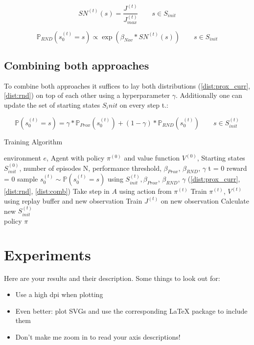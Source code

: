\documentclass{article}
\begin{document}
\[ SN^{(t)}(s) = \frac{J^{(t)}}{J_{max}^{(t)}} \qquad s \in S_{init} \]

\begin{equation}\label{dist:rnd}
  \mathbb{P}_{RND}(s_0^{(t)} = s) \propto \exp(\beta_{Nov} * SN^{(t)}(s)) \qquad s \in S_{init}
\end{equation}

\subsection{Combining both approaches}
\label{sec:comb}

To combine both approaches it suffices to lay both distributions (\cref{dist:prox_curr}, \cref{dist:rnd}) on top of each other using a hyperparameter $\gamma$. Additionally one can update the set of starting states $S_init$ on every step t.:

\begin{equation}\label{dist:comb}
  \mathbb{P}(s_0^{(t)} = s) = \gamma * \mathbb{P}_{Prox}(s_0^{(t)}) + (1 - \gamma) * \mathbb{P}_{RND}(s_0^{(t)}) \qquad s \in S_{init}^{(t)}
\end{equation}

\begin{algorithm}[H]
    \caption{Training Algorithm}
    \label{alg:code}
    \begin{algorithmic}
      \Require environment $e$, Agent with policy $\pi^{(0)}$ and value function $V^{(0)}$, Starting states $S_{init}^{(0)}$, number of episodes N, performance threshold, $\beta_{Prox}$, $\beta_{RND}$, $\gamma$ \eta
        \State t = 0
        \State reward = 0
        \State sample $s_0^{(t)} \sim \mathbb{P}(s_0^{(t)} = s)$ using $S_{init}^{(t)}, \beta_{Prox}$, $\beta_{RND}$, $\gamma$ (\cref{dist:prox_curr}, \cref{dist:rnd}, \cref{dist:comb})
          \State Take step in $A$ using action from $\pi^{(t)}$
          \State Train $\pi^{(t)}$, $V^{(t)}$ using replay buffer and new observation
          \State Train $J^{(t)}$ on new observation
          \State Calculate new $S_{init}^{(t)}$
        \EndWhile \\
        \Return policy $\pi$
    \end{algorithmic}
\end{algorithm}


\section{Experiments}
Here are your results and their description. Some things to look out for:
\begin{itemize}
    \item Use a high dpi when plotting
    \item Even better: plot SVGs and use the corresponding LaTeX package to include them
    \item Don't make me zoom in to read your axis descriptions!
\end{itemize}
\end{document}
